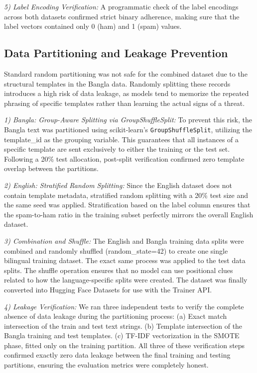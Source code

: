 \documentclass[journal]{IEEEtran}
\begin{document}
\textit{5) Label Encoding Verification:} A programmatic check of the label encodings across both datasets confirmed strict binary adherence, making sure that the label vectors contained only 0 (ham) and 1 (spam) values.

\subsection{Data Partitioning and Leakage Prevention}

Standard random partitioning was not safe for the combined dataset due to the structural templates in the Bangla data. Randomly splitting these records introduces a high risk of data leakage, as models tend to memorize the repeated phrasing of specific templates rather than learning the actual signs of a threat.

\textit{1) Bangla: Group-Aware Splitting via GroupShuffleSplit:} To prevent this risk, the Bangla text was partitioned using scikit-learn's \texttt{GroupShuffleSplit}, utilizing the template\_id as the grouping variable. This guarantees that all instances of a specific template are sent exclusively to either the training or the test set. Following a 20\% test allocation, post-split verification confirmed zero template overlap between the partitions.

\textit{2) English: Stratified Random Splitting:} Since the English dataset does not contain template metadata, stratified random splitting with a 20\% test size and the same seed was applied. Stratification based on the label column ensures that the spam-to-ham ratio in the training subset perfectly mirrors the overall English dataset.

\textit{3) Combination and Shuffle:} The English and Bangla training data splits were combined and randomly shuffled (random\_state=42) to create one single bilingual training dataset. The exact same process was applied to the test data splits. The shuffle operation ensures that no model can use positional clues related to how the language-specific splits were created. The dataset was finally converted into Hugging Face Datasets for use with the Trainer API.

\textit{4) Leakage Verification:} We ran three independent tests to verify the complete absence of data leakage during the partitioning process:
(a) Exact match intersection of the train and test text strings.
(b) Template intersection of the Bangla training and test templates.
(c) TF-IDF vectorization in the SMOTE phase, fitted only on the training partition.
All three of these verification steps confirmed exactly zero data leakage between the final training and testing partitions, ensuring the evaluation metrics were completely honest.
\end{document}
